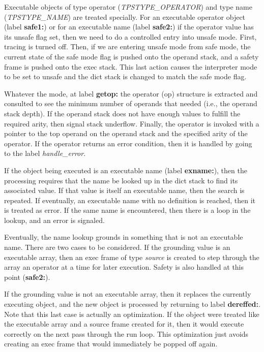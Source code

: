 Executable objects of
type operator ({\em TPSTYPE\_OPERATOR})
and
type name ({\em TPSTYPE\_NAME})
are treated specially.
For an executable operator object (label {\bf safe1:})
or for an executable name (label {\bf safe2:})
if the operator value
has its unsafe flag set, then we need to do a controlled
entry into unsafe mode.
First, tracing is turned off.
Then, if we are entering unsafe mode from safe mode,
the current state of the safe mode flag is pushed onto the operand stack,
and a safety frame is pushed onto the exec stack.
This last action causes the interpreter mode to be set to unsafe
and the dict stack is changed to match the safe mode flag.

Whatever the mode, at label {\bf getop:}
the operator (op) structure is extracted
and consulted to see
the minimum number of operands that needed (i.e., the operand stack depth).
If the operand stack does not have enough values
to fulfill the required arity, then signal stack underflow.
Finally, the operator is invoked with a pointer to the top
operand on the operand stack and the specified arity of the operator.
If the operator returns an error condition, then it is handled
by going to the label {\em handle\_error}.

If the object being executed is an executable name (label {\bf exname:}),
then the processing
requires that the name be looked up in the dict stack
to find its associated value.  If that value is itself
an executable name, then the search is repeated.
If eventually, an executable name with no definition is
reached, then it is treated as error.
If the same name is encountered, then there is a loop in the
lookup, and an error is signaled.

Eventually, the name lookup grounds in something that is not
an executable name.
There are two cases to be considered.
If the grounding value is an executable array,
then an exec frame of type {\em source} is created
to step through the array an operator at a time
for later execution.
Safety is also handled at this point ({\bf safe2:}).

If the grounding value is not an executable array, then
it replaces the currently executing object, and the new object
is processed by returning to label {\bf dereffed:}.
Note that this last case is actually an optimization.
If the object were treated like the executable array
and a source frame created for it, then it would
execute correctly on the next
pass through the run loop.
This optimization just avoids creating an exec frame
that would immediately be popped off again.

